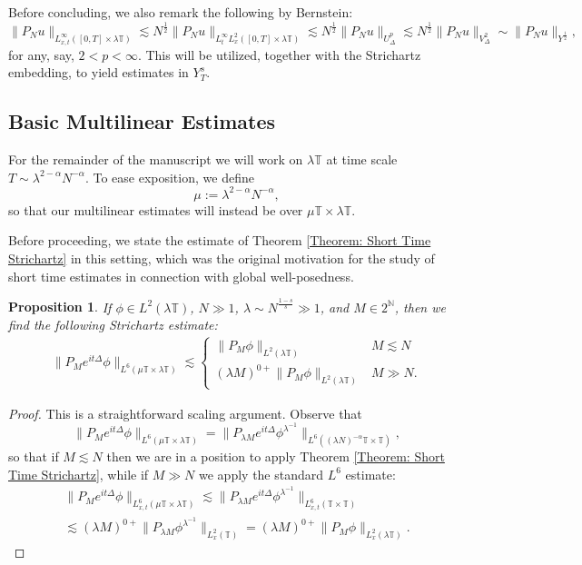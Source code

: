 \documentclass[12pt, letterpaper]{amsart}
\newtheorem{proposition}{Proposition}
\begin{document}
Before concluding, we also remark the following by Bernstein:
\[
\|P_N u\|_{L^\infty_{x,t}([0,T]\times\lambda\mathbb{T})}\lesssim N^{\frac12}\|P_Nu\|_{L^\infty_tL^2_x([0,T]\times\lambda\mathbb{T})}\lesssim N^{\frac12}\|P_Nu\|_{U^p_\Delta}\lesssim N^{\frac12}\|P_Nu\|_{V^2_\Delta}\sim \|P_Nu\|_{Y^{\frac12}},
\]
for any, say, $2 < p < \infty$. This will be utilized, together with the Strichartz embedding, to yield estimates in $Y^s_{T}$.
\subsection{Basic Multilinear Estimates}\label{Section: Basic Multilinear Estimates}
For the remainder of the manuscript we will work on $\lambda\mathbb{T}$ at time scale $T\sim \lambda^{2-\alpha}N^{-\alpha}$. To ease exposition, we define 
\begin{equation}\label{Equation: mu definition}
    \mu := \lambda^{2-\alpha}N^{-\alpha},
\end{equation}
so that our multilinear estimates will instead be over $\mu\mathbb{T}\times\lambda\mathbb{T}$.


Before proceeding, we state the estimate of Theorem \ref{Theorem: Short Time Strichartz} in this setting, which was the original motivation for the study of short time estimates in connection with global well-posedness. 
\begin{proposition}\label{Proposition: Scaled Strichartz}
    If $\phi\in L^2(\lambda\mathbb{T})$, $N\gg 1$, $\lambda\sim N^\frac{1-s}{s}\gg 1$, and $M\in 2^\mathbb{N}$, then we find the following Strichartz estimate:
    \begin{align*}
        \|P_{M}e^{it\Delta}\phi\|_{L^6(\mu\mathbb{T}\times\lambda\mathbb{T})}\lesssim 
        \begin{cases}
            \|P_M\phi\|_{L^2(\lambda\mathbb{T})} & M\lesssim N\\
            (\lambda M)^{0+}\|P_M\phi\|_{L^2(\lambda\mathbb{T})} & M\gg N.
        \end{cases}
    \end{align*}
\end{proposition}
\begin{proof}
    This is a straightforward scaling argument. Observe that
    \[
\|P_{M}e^{it\Delta}\phi\|_{L^6(\mu\mathbb{T}\times\lambda\mathbb{T})} = \|P_{\lambda M}e^{it\Delta}\phi^{\lambda^{-1}}\|_{L^6((\lambda N)^{-\alpha}\mathbb{T}\times\mathbb{T})},
    \]
    so that if $M\lesssim N$ then we are in a position to apply Theorem \ref{Theorem: Short Time Strichartz}, while if $M\gg N$ we apply the standard $L^6$ estimate:
    \begin{multline*}
    \|P_Me^{it\Delta}\phi\|_{L^6_{x,t}(\mu\mathbb{T}\times\lambda\mathbb{T})} \lesssim \|P_{\lambda M} e^{it\Delta}\phi^{\lambda^{-1}}\|_{L^6_{x,t}(\mathbb{T}\times\mathbb{T})}\\
    \lesssim (\lambda M)^{0+}\|P_{\lambda M}\phi^{\lambda^{-1}}\|_{L^2_x(\mathbb{T})} = (\lambda M)^{0+}\|P_{M}\phi\|_{L^2_x(\mathbb{\lambda T})}.
    \end{multline*}
\end{proof}
\end{document}
